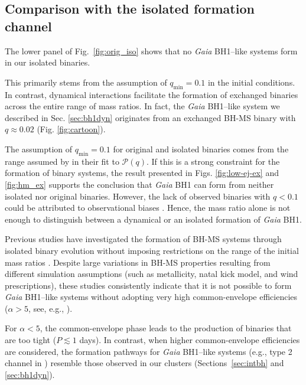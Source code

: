 \documentclass[fleqn,usenatbib]{mnras}
\newcommand{\bh}{\textit{Gaia} BH1}
\begin{document}
\subsection{Comparison with the isolated formation channel} \label{sec:iso}


The lower panel of Fig.~\ref{fig:orig_iso}  shows that no \bh--like systems form in our isolated binaries. 

This primarily stems from the assumption of $q_\mathrm{min}=0.1$ in the initial conditions. In contrast, dynamical interactions facilitate the formation of exchanged binaries across the entire range of mass ratios. In fact, the \bh--like system we described in Sec. \ref{sec:bh1dyn} originates from an exchanged BH-MS binary with $q\approx 0.02$ (Fig. \ref{fig:cartoon}).

The assumption of $q_\mathrm{min}=0.1$ for original and isolated binaries comes from the range assumed by  \cite{sana12} in their fit to $\mathcal{P}(q)$. 
If this is 
a strong constraint  for the formation of   binary systems, the result presented  in Figs. \ref{fig:low-ej-ex} and \ref{fig:hm_ex} 
supports the conclusion that \bh{} can form from neither isolated nor original binaries. 
However, 
the lack of observed binaries with $q<0.1$ could be attributed to observational biases \citep[e.g.,][]{moe2015,moe17,tokovinin2020}.  
Hence, the mass ratio alone is not enough to
distinguish between a dynamical or an isolated formation of \bh. 

Previous studies have investigated the formation of BH-MS systems through isolated binary evolution 
without imposing restrictions on the range of the initial mass ratios \citep[see e.g.][]{breivik2017,Shao2019,Wiktorowicz2020,chawla2022,shikauchi2022,shikauchi23}.   Despite large variations in BH-MS properties resulting from different simulation assumptions (such as metallicity, natal kick model, and wind prescriptions), these studies consistently indicate that it is not possible to form \bh--like systems without adopting very high common-envelope efficiencies ($\alpha>5$, see, e.g., \citealt{elbadry2023a}). 
 
For 
$\alpha<5$, the common-envelope phase leads to the production of binaries that are too tight ($P\lesssim 1$ days). 
In contrast, when higher common-envelope efficiencies are considered, the formation pathways for \bh--like systems (e.g., type 2 channel in \citealt{shikauchi23}) resemble those observed in our clusters (Sections~\ref{sec:intbh} and \ref{sec:bh1dyn}).
\end{document}
